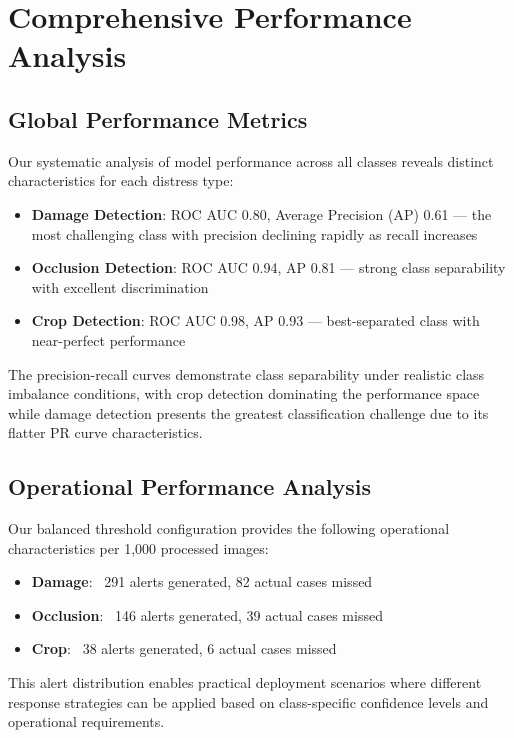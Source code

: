 \documentclass[12pt,twocolumn]{article}
\begin{document}
\section{Comprehensive Performance Analysis}

\subsection{Global Performance Metrics}

Our systematic analysis of model performance across all classes reveals distinct characteristics for each distress type:

\begin{itemize}[itemsep=1pt,parsep=0pt,topsep=3pt]
\item \textbf{Damage Detection}: ROC AUC 0.80, Average Precision (AP) 0.61 — the most challenging class with precision declining rapidly as recall increases
\item \textbf{Occlusion Detection}: ROC AUC 0.94, AP 0.81 — strong class separability with excellent discrimination
\item \textbf{Crop Detection}: ROC AUC 0.98, AP 0.93 — best-separated class with near-perfect performance
\end{itemize}

The precision-recall curves demonstrate class separability under realistic class imbalance conditions, with crop detection dominating the performance space while damage detection presents the greatest classification challenge due to its flatter PR curve characteristics.

\subsection{Operational Performance Analysis}

Our balanced threshold configuration provides the following operational characteristics per 1,000 processed images:

\begin{itemize}[itemsep=1pt,parsep=0pt,topsep=3pt]
\item \textbf{Damage}: ~291 alerts generated, 82 actual cases missed
\item \textbf{Occlusion}: ~146 alerts generated, 39 actual cases missed  
\item \textbf{Crop}: ~38 alerts generated, 6 actual cases missed
\end{itemize}

This alert distribution enables practical deployment scenarios where different response strategies can be applied based on class-specific confidence levels and operational requirements.
\end{document}
